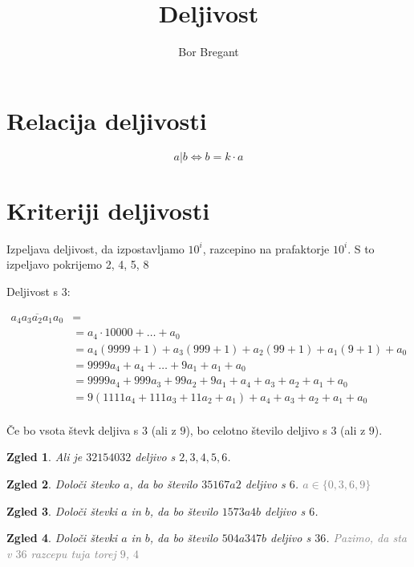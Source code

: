 \documentclass{article}
\title{Deljivost}
\author{Bor Bregant}
\date{\vspace{-5ex}}
\newtheorem*{zgled}{Zgled}
\begin{document}
\maketitle

\section{Relacija deljivosti}

\[a|b \iff b=k\cdot a\]

\section{Kriteriji deljivosti}

Izpeljava deljivost, da izpostavljamo $10^i$, razcepino na prafaktorje $10^i$. S to izpeljavo pokrijemo 2, 4, 5, 8

Deljivost s $3$:

\begin{align*}
\overline{a_4 a_3 a_2 a_1 a_0} &=\\
 &=a_4 \cdot 10000 + \ldots + a_0\\
 &=a_4 (9999+1)+a_3(999+1)+a_2(99+1)+a_1(9+1)+a_0\\
 &=9999a_4 + a_4 + \ldots + 9a_1 +a_1 +a_0\\
 &=9999a_4+999a_3+99a_2+9a_1 +a_4+a_3+a_2+a_1+a_0\\
 &=9(1111a_4 +111a_3+11a_2+a_1)+a_4+a_3+a_2+a_1+a_0\\
\end{align*}

Če bo vsota števk deljiva s $3$ (ali z $9$), bo celotno število deljivo s $3$ (ali z $9$).

\begin{zgled}
    Ali je $32154032$ deljivo s $2,3,4,5,6$.
\end{zgled}

\begin{zgled}
    Določi števko $a$, da bo število $35167a2$ deljivo s $6$. \textcolor{gray}{$a\in\{0,3,6,9\}$}
\end{zgled}

\begin{zgled}
    Določi števki $a$ in $b$, da bo število $1573a4b$ deljivo s $6$.
\end{zgled}

\begin{zgled}
    Določi števki $a$ in $b$, da bo število $504a347b$ deljivo s $36$. \textcolor{gray}{Pazimo, da sta v $36$ razcepu tuja torej $9$, $4$}
\end{zgled}
\end{document}
